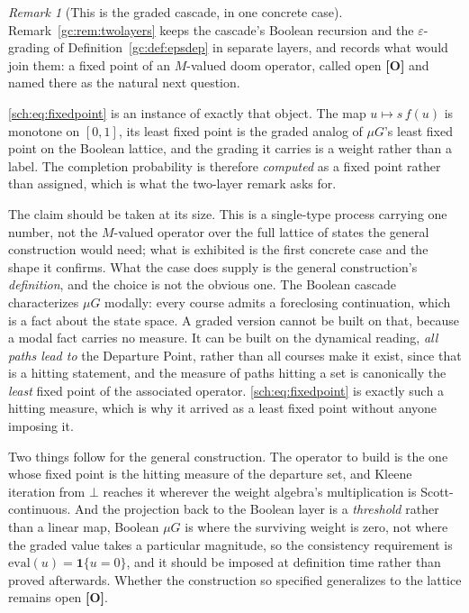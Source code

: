 \documentclass[11pt]{article}
\numberwithin{equation}{section}
\theoremstyle{plain}
\theoremstyle{definition}
\theoremstyle{remark}
\newtheorem{remark}[theorem]{Remark}
\newcommand{\one}{\mathbf{1}}
\begin{document}
\begin{remark}[This is the graded cascade, in one concrete case]
\label{sch:rem:mvalued}
Remark~\ref{gc:rem:twolayers} keeps the cascade's Boolean recursion and the
$\varepsilon$-grading of Definition~\ref{gc:def:epsdep} in separate
layers, and records what would join them: a fixed point of an
$M$-valued doom operator, called open \textbf{[O]} and named there as
the natural next question.

\eqref{sch:eq:fixedpoint} is an instance of exactly that object. The map
$u\mapsto s\,f(u)$ is monotone on $[0,1]$, its least fixed point is the
graded analog of $\mu G$'s least fixed point on the Boolean lattice,
and the grading it carries is a weight rather than a label. The
completion probability is therefore \emph{computed} as a fixed point
rather than assigned, which is what the two-layer remark asks for.

The claim should be taken at its size. This is a single-type process
carrying one number, not the $M$-valued operator over the full lattice
of states the general construction would need; what is exhibited is the
first concrete case and the shape it confirms. What the case does supply is the general construction's
\emph{definition}, and the choice is not the obvious one. The Boolean
cascade characterizes $\mu G$ modally: every course admits a foreclosing
continuation, which is a fact about the state space. A graded version
cannot be built on that, because a modal fact carries no measure. It can
be built on the dynamical reading, \emph{all paths lead to} the
Departure Point, rather than all courses make it exist, since that is
a hitting statement, and the measure of paths hitting a set is
canonically the \emph{least} fixed point of the associated operator.
\eqref{sch:eq:fixedpoint} is exactly such a hitting measure, which is why
it arrived as a least fixed point without anyone imposing it.

Two things follow for the general construction. The operator to build is
the one whose fixed point is the hitting measure of the departure set,
and Kleene iteration from $\bot$ reaches it wherever the weight algebra's
multiplication is Scott-continuous. And the projection back to the
Boolean layer is a \emph{threshold} rather than a linear map, Boolean
$\mu G$ is where the surviving weight is zero, not where the graded value
takes a particular magnitude, so the consistency requirement is
$\mathrm{eval}(u)=\one\{u=0\}$, and it should be imposed at definition
time rather than proved afterwards. Whether the construction so specified
generalizes to the lattice remains open \textbf{[O]}.
\end{remark}
\end{document}
